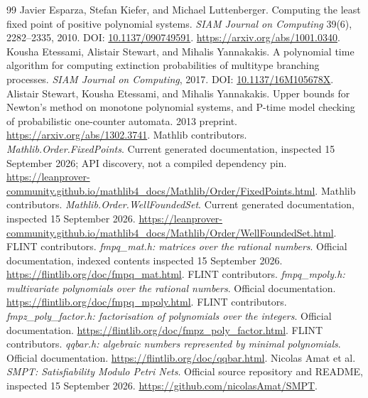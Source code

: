 \begin{thebibliography}{99}
 Javier Esparza, Stefan Kiefer, and Michael Luttenberger. Computing the least fixed point of positive polynomial systems. \emph{SIAM Journal on Computing} 39(6), 2282--2335, 2010. DOI: \href{https://doi.org/10.1137/090749591}{10.1137/090749591}. \url{https://arxiv.org/abs/1001.0340}.
 Kousha Etessami, Alistair Stewart, and Mihalis Yannakakis. A polynomial time algorithm for computing extinction probabilities of multitype branching processes. \emph{SIAM Journal on Computing}, 2017. DOI: \href{https://doi.org/10.1137/16M105678X}{10.1137/16M105678X}.
 Alistair Stewart, Kousha Etessami, and Mihalis Yannakakis. Upper bounds for Newton's method on monotone polynomial systems, and P-time model checking of probabilistic one-counter automata. 2013 preprint. \url{https://arxiv.org/abs/1302.3741}.
 Mathlib contributors. \emph{Mathlib.Order.FixedPoints}. Current generated documentation, inspected 15 September 2026; API discovery, not a compiled dependency pin. \url{https://leanprover-community.github.io/mathlib4_docs/Mathlib/Order/FixedPoints.html}.
 Mathlib contributors. \emph{Mathlib.Order.WellFoundedSet}. Current generated documentation, inspected 15 September 2026. \url{https://leanprover-community.github.io/mathlib4_docs/Mathlib/Order/WellFoundedSet.html}.
 FLINT contributors. \emph{fmpq\_mat.h: matrices over the rational numbers}. Official documentation, indexed contents inspected 15 September 2026. \url{https://flintlib.org/doc/fmpq_mat.html}.
 FLINT contributors. \emph{fmpq\_mpoly.h: multivariate polynomials over the rational numbers}. Official documentation. \url{https://flintlib.org/doc/fmpq_mpoly.html}.
 FLINT contributors. \emph{fmpz\_poly\_factor.h: factorisation of polynomials over the integers}. Official documentation. \url{https://flintlib.org/doc/fmpz_poly_factor.html}.
 FLINT contributors. \emph{qqbar.h: algebraic numbers represented by minimal polynomials}. Official documentation. \url{https://flintlib.org/doc/qqbar.html}.
 Nicolas Amat et al. \emph{SMPT: Satisfiability Modulo Petri Nets}. Official source repository and README, inspected 15 September 2026. \url{https://github.com/nicolasAmat/SMPT}.
\end{thebibliography}
\endgroup
